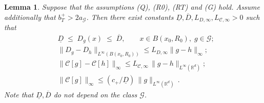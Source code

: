 \documentclass[11pt]{article}
\newtheorem{lemma}[proposition]{Lemma}         %
\theoremstyle{remark}
\numberwithin{equation}{section}
\newcommand{\R}{\mathbb{R}}
\def\bmax{b_T^{+}}
\def\cmax{c_{+}}
\def\aGmin{a_{\mathcal{G}}}
\begin{document}
\begin{lemma}
\label{lemm: key properties}
Suppose that the assumptions \emph{(Q)}, \emph{(R0)}, \emph{(RT)} and \emph{(G)} hold.  Assume additionally that $\bmax> 2 \aGmin$. Then there exist constants $\underline{D}, \overline{D}, L_{D,\infty}, L_{\mathcal C, \infty} > 0$ such that
\begin{align}
\label{D bounds}
  & \underline{D}
  \;\le\;
  D_g(x)
  \;\le\;
  \overline{D},
  \qquad x\in B(x_0,R_0),\; g\in\mathcal{G}; \\
  \label{D Lip}
  & \|D_g-D_h\|_{L^\infty(B(x_0, R_0))}
  \le
  L_{D,\infty} \|g-h\|_{\infty};  \\
  \label{C lip infty}
  & \|\mathcal C[g]-\mathcal C[h]\|_\infty
  \le
  L_{\mathcal C, \infty}\,\|g-h\|_{L^\infty(\R^d)}; \\
  \label{C infty}
  & \|\mathcal C[g]\|_\infty
  \le
  (\cmax/\underline{D})\,\|g\|_{L^\infty(\R^d)}\, .
\end{align}
Note that $\underline{D}, \overline{D}$ do not depend on the class $\mathcal G$. 
\end{lemma}
\end{document}
